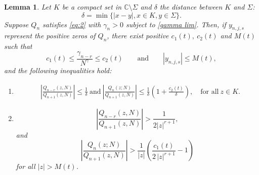 \documentclass[12pt]{article}
\newtheorem{lemma}[theorem]{Lemma}
\numberwithin{equation}{section}
\begin{document}
\begin{lemma}\label{lem: ratio1} Let $K$ be a compact set in $\mathbb{C} \setminus \Sigma$ and $\delta$ the distance between $K$ and $\Sigma$:
\[   \delta = \min  \{ |x-y|, x \in K, y \in \Sigma \}.  \] 
Suppose $Q_n$ satisfies \eqref{eq:2} with $\gamma_n>0$ subject to \eqref{gamma lim}. Then,  if $y_{n,j,s}$ represent the positive zeros of $Q_n$, there exist positive $c_1(t), \ c_2(t)$ and  $M(t)$ such that 
\[ 
	c_1(t) \leq \frac{\gamma_{n-r}} {N^\gamma} \leq c_2 (t)
	\qquad \text{and}\qquad 
	\left| y_{n,j,s}\right|\leq M(t), 
\]
 and the following inequalities hold: 
\begin{enumerate}
\item[(a)]
\begin{align}
& \label{ratio r Qn}
		\left|\frac{Q_{n-r}(z,N)}{Q_{n+1}(z,N)}  \right|
	\leq  \frac{1}{\delta}
	\ \text{and}\ 
	 \left|\frac{ Q_n(z;N)}{Q_{n+1}(z,N)} \right|
	 \leq \frac{1}{\delta} \left( 1 + \frac{c_2(t)}{\delta}\right),  \quad\text{for all} \ z \in K. 
\end{align}

\item[(b)] 
\[
	\left| \frac{Q_{n-r}(z,N)}{Q_{n+1}(z,N)}  \right| > \frac{1}{2|z|^{r+1}} , \]
and 
\[ \left|\frac{ Q_n(z;N)}{Q_{n+1}(z,N)} \right| > \frac{1}{|z|}\left(   \frac{c_1(t)}{2\, |z|^{r+1}} -1\right) \]
for all $|z| > M(t)$.

\end{enumerate}
\end{lemma}
 
\end{document}

